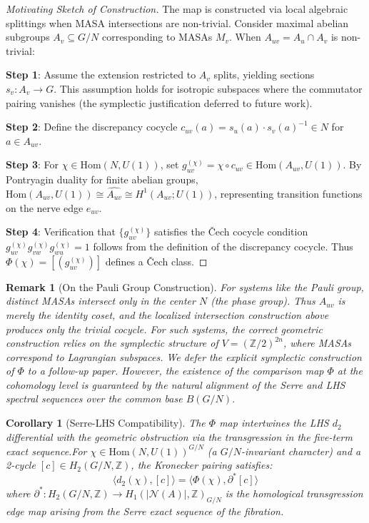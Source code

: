 \documentclass[11pt]{article}
\newtheorem{remark}[theorem]{Remark}
\newtheorem{corollary}[theorem]{Corollary}
\begin{document}
\begin{proof}[Motivating Sketch of Construction]
The map is constructed via local algebraic splittings when MASA intersections are non-trivial. Consider maximal abelian subgroups $A_v \subseteq G/N$ corresponding to MASAs $M_v$. When $A_{uv} = A_u \cap A_v$ is non-trivial:

\textbf{Step 1}: Assume the extension restricted to $A_v$ splits, yielding sections $s_v: A_v \to G$. This assumption holds for isotropic subspaces where the commutator pairing vanishes (the symplectic justification deferred to future work).

\textbf{Step 2}: Define the discrepancy cocycle $c_{uv}(a) = s_u(a) \cdot s_v(a)^{-1} \in N$ for $a \in A_{uv}$.

\textbf{Step 3}: For $\chi \in \mathrm{Hom}(N, U(1))$, set $g_{uv}^{(\chi)} = \chi \circ c_{uv} \in \mathrm{Hom}(A_{uv}, U(1))$. By Pontryagin duality for finite abelian groups, $\mathrm{Hom}(A_{uv}, U(1)) \cong \widehat{A_{uv}} \cong H^1(A_{uv}; U(1))$, representing transition functions on the nerve edge $e_{uv}$.

\textbf{Step 4}: Verification that $\{g_{uv}^{(\chi)}\}$ satisfies the \v{C}ech cocycle condition $g_{uv}^{(\chi)} g_{vw}^{(\chi)} g_{wu}^{(\chi)} = 1$ follows from the definition of the discrepancy cocycle. Thus $\Phi(\chi) = [(g_{uv}^{(\chi)})]$ defines a \v{C}ech class.
\end{proof}

\begin{remark}[On the Pauli Group Construction]\label{rem:phi-construction}
For systems like the Pauli group, distinct MASAs intersect only in the center $N$ (the phase group). Thus $A_{uv}$ is merely the identity coset, and the localized intersection construction above produces only the trivial cocycle. For such systems, the correct geometric construction relies on the symplectic structure of $V = (\mathbb{Z}/2)^{2n}$, where MASAs correspond to Lagrangian subspaces. We defer the explicit symplectic construction of $\Phi$ to a follow-up paper. However, the existence of the comparison map $\Phi$ at the cohomology level is guaranteed by the natural alignment of the Serre and LHS spectral sequences over the common base $B(G/N)$.
\end{remark}

\begin{corollary}[Serre-LHS Compatibility]\label{cor:compatibility}
The $\Phi$ map intertwines the LHS $d_2$ differential with the geometric obstruction via the transgression in the five-term exact sequence.\linebreak For $\chi \in \mathrm{Hom}(N, U(1))^{G/N}$ (a $G/N$-invariant character) and a 2-cycle $[c] \in H_2(G/N, \mathbb{Z})$, the Kronecker pairing satisfies:
\[
\langle d_2(\chi), [c] \rangle = \langle \Phi(\chi), \partial^* [c] \rangle
\]
where $\partial^*: H_2(G/N, \mathbb{Z}) \to H_1(|\mathcal{N}(A)|, \mathbb{Z})_{G/N}$ is the homological transgression edge map arising from the Serre exact sequence of the fibration.
\end{corollary}
\end{document}
